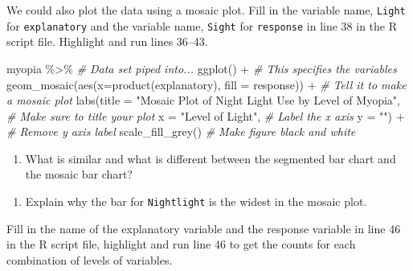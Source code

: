 \documentclass[
]{report}
\newenvironment{Shaded}{\begin{snugshade}}{\end{snugshade}}
\newcommand{\AttributeTok}[1]{\textcolor[rgb]{0.77,0.63,0.00}{#1}}
\newcommand{\CommentTok}[1]{\textcolor[rgb]{0.56,0.35,0.01}{\textit{#1}}}
\newcommand{\FunctionTok}[1]{\textcolor[rgb]{0.00,0.00,0.00}{#1}}
\newcommand{\NormalTok}[1]{#1}
\newcommand{\SpecialCharTok}[1]{\textcolor[rgb]{0.00,0.00,0.00}{#1}}
\newcommand{\StringTok}[1]{\textcolor[rgb]{0.31,0.60,0.02}{#1}}
\providecommand{\tightlist}{%
  \setlength{\itemsep}{0pt}\setlength{\parskip}{0pt}}
\begin{document}
We could also plot the data using a mosaic plot. Fill in the variable name, \texttt{Light} for \texttt{explanatory} and the variable name, \texttt{Sight} for \texttt{response} in line 38 in the R script file. Highlight and run lines 36--43.

\begin{Shaded}
\begin{Highlighting}[]
\NormalTok{myopia }\SpecialCharTok{\%\textgreater{}\%} \CommentTok{\# Data set piped into...}
  \FunctionTok{ggplot}\NormalTok{() }\SpecialCharTok{+}   \CommentTok{\# This specifies the variables}
  \FunctionTok{geom\_mosaic}\NormalTok{(}\FunctionTok{aes}\NormalTok{(}\AttributeTok{x=}\FunctionTok{product}\NormalTok{(explanatory), }\AttributeTok{fill =}\NormalTok{ response)) }\SpecialCharTok{+}  \CommentTok{\# Tell it to make a mosaic plot}
  \FunctionTok{labs}\NormalTok{(}\AttributeTok{title =} \StringTok{"Mosaic Plot of Night Light Use by Level of Myopia"}\NormalTok{,  }
       \CommentTok{\# Make sure to title your plot }
       \AttributeTok{x =} \StringTok{"Level of Light"}\NormalTok{,   }\CommentTok{\# Label the x axis}
       \AttributeTok{y =} \StringTok{""}\NormalTok{) }\SpecialCharTok{+}  \CommentTok{\# Remove y axis label}
      \FunctionTok{scale\_fill\_grey}\NormalTok{()  }\CommentTok{\# Make figure black and white}
\end{Highlighting}
\end{Shaded}

\begin{enumerate}
\def\labelenumi{\arabic{enumi}.}
\setcounter{enumi}{8}
\tightlist
\item
  What is similar and what is different between the segmented bar chart and the mosaic bar chart?
\end{enumerate}

\vspace{1in}

\begin{enumerate}
\def\labelenumi{\arabic{enumi}.}
\setcounter{enumi}{9}
\tightlist
\item
  Explain why the bar for \texttt{Nightlight} is the widest in the mosaic plot.
\end{enumerate}

\vspace{0.8in}

Fill in the name of the explanatory variable and the response variable in line 46 in the R script file, highlight and run line 46 to get the counts for each combination of levels of variables.
\end{document}
